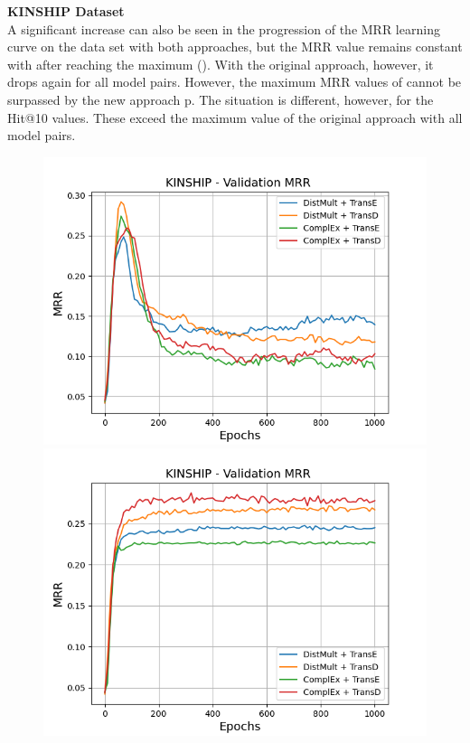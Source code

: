 \textbf{KINSHIP Dataset}
\label{subsubsec:uncertainty_kinship}\\
%
A significant increase can also be seen in the progression of the MRR learning curve on the \kinship data set with both approaches, but the MRR value remains constant with \usgan after reaching the maximum ().
With the original \kbgan approach, however, it drops again for all model pairs.
However, the maximum MRR values of \kbgan cannot be surpassed by the new approach \usgan p.
The situation is different, however, for the Hit@10 values.
These exceed the maximum value of the original approach with all model pairs.
\begin{figure}[H]
    \centering
    \begin{minipage}{.5\textwidth}
      \centering
      \includegraphics[width=0.9\linewidth]{figures/results/gan_train/not_pretrained/random/kinship/1k_epochs/random_kinship_mrrs.png}
    \end{minipage}%
    \begin{minipage}{.5\textwidth}
      \centering
      \includegraphics[width=0.9\linewidth]{figures/results/gan_train/not_pretrained/uncertainty/max_distribution/entropy/kinship/1k_epochs/uncertainty_kinship_mrrs.png}

\end{minipage}
\end{figure}
